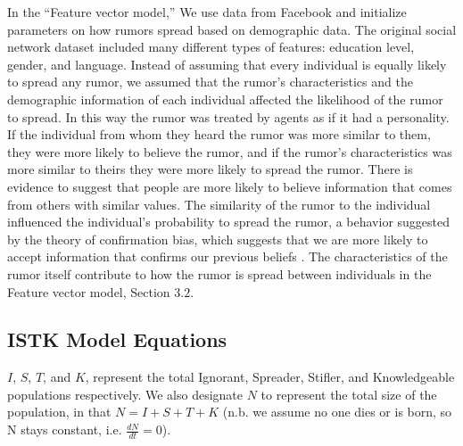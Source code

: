  In the ``Feature vector model,'' We use data from Facebook and initialize parameters on how rumors spread based on demographic data. The original social network dataset included many different types of features: education level, gender, and language. Instead of assuming that every individual is equally likely to spread any rumor, we assumed that the rumor's characteristics and the demographic information of each individual affected the likelihood of the rumor to spread. In this way the rumor was treated by agents as if it had a personality. If the individual from whom they heard the rumor was more similar to them, they were more likely to believe the rumor, and if the rumor's characteristics was more similar to theirs they were more likely to spread the rumor. There is evidence to suggest that people are more likely to believe information that comes from others with similar values\cite{gillespie-2004}. The similarity of the rumor to the individual influenced the individual's probability to spread the rumor, a behavior suggested by the theory of confirmation bias, which suggests that we are more likely to accept information that confirms our previous beliefs \cite{wason-1960}. The characteristics of the rumor itself contribute to how the rumor is spread between individuals in the Feature vector model, Section $3.2$.

\subsection{ISTK Model Equations}
\label{subsec:istkeqns}


\noindent $ I $, $ S $, $ T $, and $ K $, represent the total Ignorant, Spreader, Stifler, and Knowledgeable populations respectively. We also designate $ N $ to represent the total size of the population, in that $ N = I + S + T + K $ (n.b. we assume no one dies or is born, so N stays constant, i.e. $\frac{dN}{dt} = 0$).

